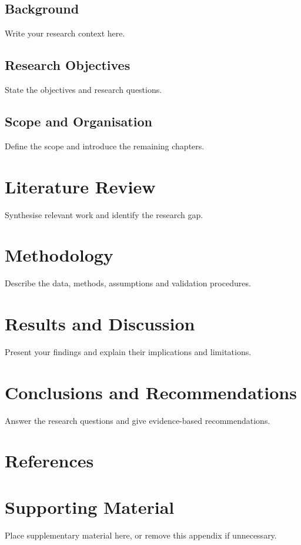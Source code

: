 \documentclass[12pt,a4paper,oneside]{report}
\begin{document}
\section{Background}
Write your research context here.
\section{Research Objectives}
State the objectives and research questions.
\section{Scope and Organisation}
Define the scope and introduce the remaining chapters.

\chapter{Literature Review}
Synthesise relevant work and identify the research gap.

\chapter{Methodology}
Describe the data, methods, assumptions and validation procedures.

\chapter{Results and Discussion}
Present your findings and explain their implications and limitations.

\chapter{Conclusions and Recommendations}
Answer the research questions and give evidence-based recommendations.

\chapter*{References}
{}
\printbibliography[heading=none]

\appendix
\chapter{Supporting Material}
Place supplementary material here, or remove this appendix if unnecessary.
\end{document}
